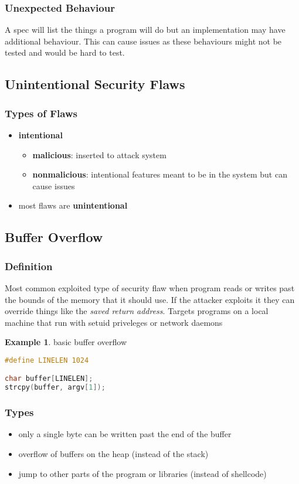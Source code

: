 \documentclass[]{article}
\theoremstyle{definition}
\newtheorem{ex}{Example}[section]
\begin{document}
	\subsubsection{Unexpected Behaviour}
	A spec will list the things a program will do but an implementation may have additional behaviour. 
	This can cause issues as these behaviours might not be tested and would be hard to test.

	\subsection{Unintentional Security Flaws}
	\subsubsection{Types of Flaws}
	\begin{itemize}
		\item \textbf{intentional}
			\begin{itemize}
				\item \textbf{malicious}: inserted to attack system
				\item \textbf{nonmalicious}: intentional features meant to be in the system but can cause issues
			\end{itemize}
		\item most flaws are \textbf{unintentional}
	\end{itemize}
	\subsection{Buffer Overflow}
	\subsubsection{Definition}
	Most common exploited type of security flaw when program reads or writes past the bounds of the memory that it should use. If the attacker exploits it they can override things like the \textit{saved return address}. Targets programs on a local machine that run with setuid priveleges or network daemons
	
	\begin{ex}
		basic buffer overflow
	\begin{lstlisting}[language=C]
#define LINELEN 1024

char buffer[LINELEN];
strcpy(buffer, argv[1]);
	\end{lstlisting}
	\end{ex}
	
	\subsubsection{Types}
	\begin{itemize}
		\item only a single byte can be written past the end of the buffer
		\item overflow of buffers on the heap (instead of the stack)
		\item jump to other parts of the program or libraries (instead of shellcode)
	\end{itemize}
\end{document}
